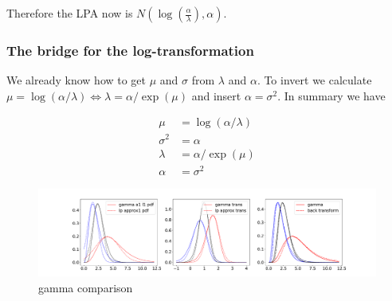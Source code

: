 Therefore the LPA now is $N(\log\left(\frac{\alpha}{\lambda}\right), \alpha)$.

\subsubsection{The bridge for the log-transformation}

We already know how to get $\mu$ and $\sigma$ from $\lambda$ and $\alpha$. To invert we calculate $\mu = \log(\alpha/\lambda) \Leftrightarrow \lambda= \alpha/\exp(\mu)$ and insert $\alpha=\sigma^2$. In summary we have

\begin{align}
	\mu &= \log(\alpha/\lambda) \\
	\sigma^2 &= \alpha \\
	\lambda &= \alpha/\exp(\mu) \\
	\alpha &= \sigma^2
\end{align}

\begin{figure}[!htb]
	\centering
	\includegraphics[width=\textwidth]{figures/gamma_playground_log.pdf}
	\caption{gamma comparison}
	\label{fig:gamma_comparison}
\end{figure}